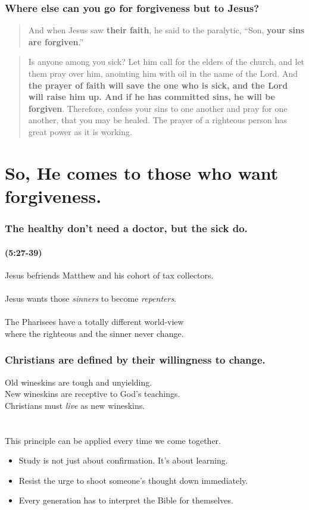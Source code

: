 \begin{frame}
\frametitle{Where else can you go for forgiveness but to Jesus?}
\begin{quote} 
And when Jesus saw \textbf{their faith}, he said to the paralytic, ``Son, \textbf{your sins are forgiven}.''

\end{quote}

\begin{quote}
Is anyone among you sick? Let him call for the elders of the church, and let them pray over him, anointing him with oil in the name of the Lord. And \textbf{the prayer of faith will save the one who is sick, and the Lord will raise him up. And if he has committed sins, he will be forgiven}. Therefore, confess your sins to one another and pray for one another, that you may be healed. The prayer of a righteous person has great power as it is working.

\end{quote}

\end{frame}

\section{So, He comes to those who want forgiveness.}

\begin{frame}
\frametitle{The healthy don't need a doctor, but the sick do.}
\framesubtitle{(5:27-39)}
Jesus befriends Matthew and his cohort of tax collectors.\\~\\
Jesus wants those \emph{sinners} to become \emph{repenters}.\\~\\
The Pharisees have a totally different world-view\\where the righteous and the sinner never change.
\end{frame}

\begin{frame}
\frametitle{Christians are defined by their willingness to change.}
Old wineskins are tough and unyielding.\\
New wineskins are receptive to God's teachings.\\
Christians must \emph{live} as new wineskins.\\~\\~\\
This principle can be applied every time we come together.
\begin{itemize}
\item Study is not just about confirmation. It's about learning.
\item Resist the urge to shoot someone's thought down immediately.
\item Every generation has to interpret the Bible for themselves.
\end{itemize}

\end{frame}

